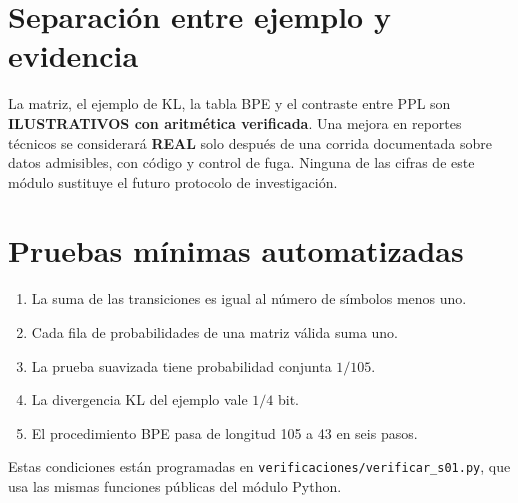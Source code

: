 \section{Separación entre ejemplo y evidencia}
La matriz, el ejemplo de KL, la tabla BPE y el contraste entre PPL
son \textbf{ILUSTRATIVOS con aritmética verificada}. Una mejora en
reportes técnicos se considerará \textbf{REAL} solo después de una
corrida documentada sobre datos admisibles, con código y control de
fuga. Ninguna de las cifras de este módulo sustituye el futuro
protocolo de investigación.
\section{Pruebas mínimas automatizadas}
\begin{enumerate}
\item La suma de las transiciones es igual al número de símbolos
menos uno.
\item Cada fila de probabilidades de una matriz válida suma uno.
\item La prueba suavizada tiene probabilidad conjunta $1/105$.
\item La divergencia KL del ejemplo vale $1/4$ bit.
\item El procedimiento BPE pasa de longitud 105 a 43 en seis pasos.
\end{enumerate}
Estas condiciones están programadas en
\texttt{verificaciones/verificar\_s01.py}, que usa las mismas
funciones públicas del módulo Python.
